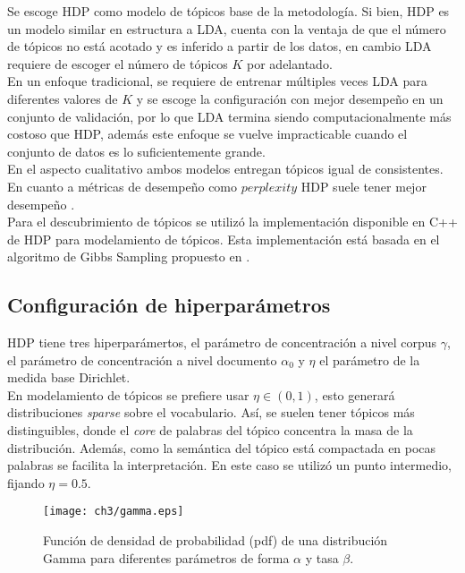\documentclass[letterpaper,12pt,oneside]{book} %
\begin{document}
Se escoge HDP como modelo de tópicos base de la metodología. Si bien, HDP es un modelo similar en estructura a LDA, cuenta con la ventaja de que el número de tópicos no está acotado y es inferido a partir de los datos, en cambio LDA requiere de escoger el número de tópicos $K$ por adelantado. \\

En un enfoque tradicional, se requiere de entrenar múltiples veces LDA para diferentes valores de $K$ y se escoge la configuración con mejor desempeño en un conjunto de validación, por lo que LDA termina siendo computacionalmente más costoso que HDP, además este enfoque se vuelve impracticable cuando el conjunto de datos es lo suficientemente grande. \\

En el aspecto cualitativo ambos modelos entregan tópicos igual de consistentes. En cuanto a métricas de desempeño como $\textit{perplexity}$ HDP suele tener mejor desempeño \citep{teh2005sharing}.\\

Para el descubrimiento de tópicos se utilizó la implementación disponible en C++ \citep{HDP} de HDP para modelamiento de tópicos. Esta implementación está basada en el algoritmo de Gibbs Sampling propuesto en \citep{teh2005sharing}.

\subsection{Configuración de hiperparámetros}
\label{sec:hdp_hiperparameters}

HDP tiene tres hiperparámertos, el parámetro de concentración a nivel corpus $\gamma$, el parámetro de concentración a nivel documento $\alpha_{0}$ y $\eta$ el parámetro de la medida base Dirichlet.\\

En modelamiento de tópicos se prefiere usar $\eta\in (0,1)$, esto generará distribuciones \textit{sparse} sobre el vocabulario. Así, se suelen tener tópicos más distinguibles, donde el \textit{core} de palabras del tópico concentra la masa de la distribución. Además, como la semántica del tópico está compactada en pocas palabras se facilita la interpretación. En este caso se utilizó un punto intermedio, fijando $\eta=0.5$.\\ 

\begin{figure}
    \texttt{[image: ch3/gamma.eps]}
    \caption{Función de densidad de probabilidad (pdf) de una distribución Gamma para diferentes parámetros de forma $\alpha$ y tasa $\beta$.}
    \label{img:gamma}
\end{figure}
\end{document}
